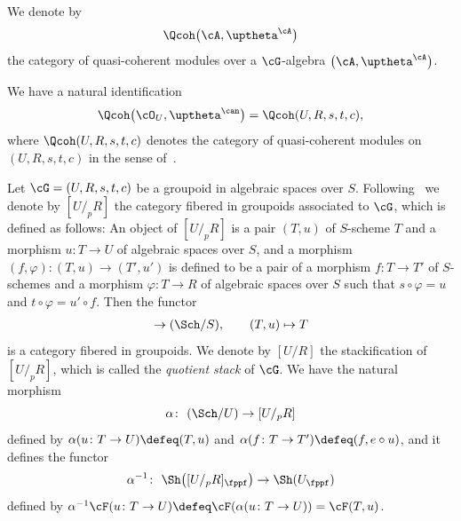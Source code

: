 We denote by
\begin{gather*}
\Qcoh\big(\cA,\uptheta^{\cA}\big)
\end{gather*}
the category of quasi-coherent modules over a $\cG$-algebra $\big(\cA,\uptheta^{\cA}\big)$.

\begin{rem}
We have a natural identification
\begin{gather*}
\Qcoh\big(\cO_U,\uptheta^{\can}\big)=\Qcoh(U,R,s,t,c),
\end{gather*}
where $\Qcoh(U,R,s,t,c)$ denotes the category of quasi-coherent modules on $(U,R,s,t,c)$ in the sense of~\cite[Definition 12.1; 0441]{stacks}.
\end{rem}


Let $\cG=(U,R,s,t, c)$ be a groupoid in algebraic spaces over $S$. Following~\cite[044O]{stacks} we denote by $[U/_pR]$ the category fibered in groupoids associated to $\cG$, which is defined as follows: An object of $[U/_pR]$ is a pair $(T,u)$ of $S$-scheme $T$ and a morphism $u\colon T\to U$ of algebraic spaces over $S$, and a morphism $(f,\varphi)\colon(T,u)\to (T',u')$ is defined to be a pair of a morphism $f\colon T\to T'$ of $S$-schemes and a morphism $\varphi\colon T\to R$ of algebraic spaces over $S$ such that $s\circ \varphi=u$ and $t\circ \varphi=u'\circ f$. Then the functor
\begin{gather*}
[U/_pR]\to (\Sch/S), \qquad (T,u)\mapsto T
\end{gather*}
is a category fibered in groupoids.
We denote by $[U/R]$ the stackification of $[U/_pR]$, which is called the {\it quotient stack} of $\cG$. We have the natural morphism
\begin{equation}\label{atlas}
\alpha\colon\ (\Sch/U)\to [U/_pR]
\end{equation}
defined by $\alpha(u\colon T\to U)\defeq(T,u)$ and $\alpha(f\colon T\to T')\defeq(f, e\circ u)$, and it defines the functor
\begin{gather*}
\alpha^{-1}\colon\ \Sh\big([U/_pR]_{\fppf}\big)\to \Sh(U_{\fppf})
\end{gather*}
defined by $\alpha^{-1}\cF(u\colon T\to U)\defeq \cF(\alpha(u\colon T\to U))=\cF(T,u)$.

